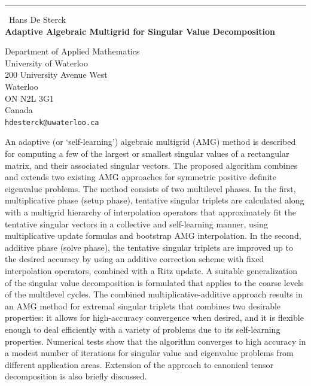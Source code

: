 \documentclass{report}
\begin{document}
\begin{center}
\rule{6in}{1pt} \
{\large Hans De Sterck \\
{\bf Adaptive Algebraic Multigrid for Singular Value Decomposition}}

Department of Applied Mathematics \\ University of Waterloo \\ 200 University Avenue West \\ Waterloo \\ ON N2L 3G1 \\ Canada
\\
{\tt hdesterck@uwaterloo.ca}\end{center}

An adaptive (or `self-learning') algebraic multigrid (AMG) method is
described for computing a few of the largest or smallest singular values
of a rectangular matrix, and their associated singular vectors. The
proposed algorithm combines and extends two existing AMG approaches for
symmetric positive definite eigenvalue problems. The method consists of
two multilevel phases. In the first, multiplicative phase (setup phase),
tentative singular triplets are calculated along with a multigrid
hierarchy of interpolation operators that approximately fit the tentative
singular vectors in a collective and self-learning manner, using
multiplicative update formulas and bootstrap AMG interpolation. In the
second, additive phase (solve phase), the tentative singular triplets are
improved up to the desired accuracy by using an additive correction
scheme with fixed interpolation operators, combined with a Ritz update. A
suitable generalization of the singular value decomposition is formulated
that applies to the coarse levels of the multilevel cycles. The combined
multiplicative-additive approach results in an AMG method for extremal
singular triplets that combines two desirable properties: it allows for
high-accuracy convergence when desired, and it is flexible enough to deal
efficiently with a variety of problems due to its self-learning
properties. Numerical tests show that the algorithm converges to high
accuracy in a modest number of iterations for singular value and
eigenvalue problems from different application areas. Extension of the
approach to canonical tensor decomposition is also briefly discussed.
\end{document}
